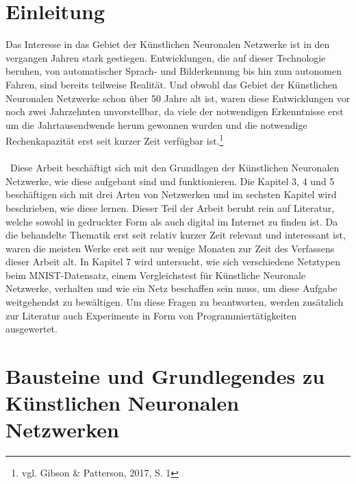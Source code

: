 \documentclass[
	a4paper,
	12pt,
	ngerman,
	oneside
]{scrreprt}											%
\newcommand{\practitioner}[1]{vgl. Gibson \& Patterson, 2017, S. {#1}}
\begin{document}
	
	
	\chapter{Einleitung}\label{Einleitung}
		Das Interesse in das Gebiet der Künstlichen Neuronalen Netzwerke ist in den vergangen Jahren stark gestiegen. Entwicklungen, die auf dieser Technologie beruhen, von automatischer Sprach- und Bilderkennung bis hin zum autonomen Fahren, sind bereits teilweise Realität. Und obwohl das Gebiet der Künstlichen Neuronalen Netzwerke schon über 50 Jahre alt ist, waren diese Entwicklungen vor noch zwei Jahrzehnten unvorstellbar, da viele der notwendigen Erkenntnisse erst um die Jahrtausendwende herum gewonnen wurden und die notwendige Rechenkapazität erst seit kurzer Zeit verfügbar ist.\footnote{\practitioner{1}} 
		\\ \
		\\ \
		Diese Arbeit beschäftigt sich mit den Grundlagen der Künstlichen Neuronalen Netzwerke, wie diese aufgebaut sind und funktionieren. Die Kapitel 3, 4 und 5 beschäftigen sich mit drei Arten von Netzwerken und im sechsten Kapitel wird beschrieben, wie diese lernen. Dieser Teil der Arbeit beruht rein auf Literatur, welche sowohl in gedruckter Form als auch digital im Internet zu finden ist. Da die behandelte Thematik erst seit relativ kurzer Zeit relevant und interessant ist, waren die meisten Werke erst seit nur wenige Monaten zur Zeit des Verfassens dieser Arbeit alt. In Kapitel 7 wird untersucht, wie sich verschiedene Netztypen beim MNIST-Datensatz, einem Vergleichstest für Künstliche Neuronale Netzwerke, verhalten und wie ein Netz beschaffen sein muss, um diese Aufgabe weitgehendst zu bewältigen. Um diese Fragen zu beantworten, werden zusätzlich zur Literatur auch Experimente in Form von Programmiertätigkeiten ausgewertet. 
		
		
	
	
	\chapter{Bausteine und Grundlegendes zu Künstlichen Neuronalen Netzwerken}\label{BausteineGrundlegendes}
	
\end{document}
